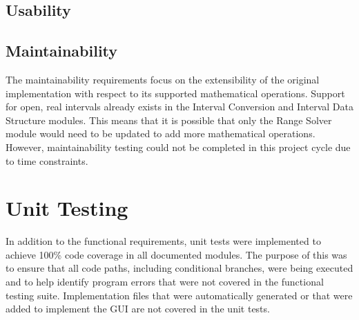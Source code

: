 \documentclass[12pt, titlepage]{article}
\begin{document}
\subsection{Usability}
		
\subsection{Maintainability}
The maintainability requirements focus on the extensibility of the original 
implementation with respect to its supported mathematical operations. Support 
for open, real intervals already exists in the Interval Conversion and Interval 
Data Structure modules. This means that it is possible that only the Range 
Solver module would need to be updated to add more mathematical operations. 
However, maintainability testing could not be completed in this project cycle 
due to time constraints.

\section{Unit Testing}
In addition to the functional requirements, unit tests were implemented to 
achieve 100\% code coverage in all documented modules. The purpose of this was 
to ensure that all code paths, including conditional branches, were being 
executed and to help identify program errors that were not covered in the 
functional testing suite. Implementation files that were automatically 
generated or that were added to implement the GUI are not covered in the unit 
tests.
\end{document}
